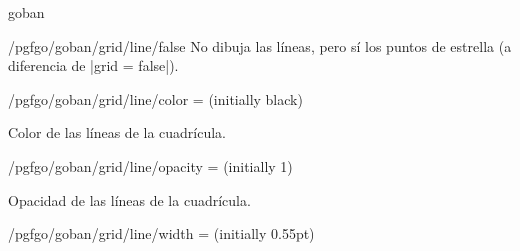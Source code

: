 \begin{environment}{{goban}}
	\begin{stylekey}{/pgfgo/goban/grid/line/false}
		No dibuja las líneas, pero sí los puntos de estrella (a diferencia de |grid = false|).

		\begin{codeexample}[]
			\begin{goban}[9, grid = {line = false}, hoshi = {radius = 2pt}]
			\end{goban}
		\end{codeexample}
	\end{stylekey}
	
	\begin{key}{/pgfgo/goban/grid/line/color = (initially black)}
		
		Color de las líneas de la cuadrícula.
		
		\begin{codeexample}[]
			
			\begin{goban}[grid = {line = {color = blue}}, name = a]
			\end{goban}
			
			\begin{goban}[grid = {line = {color = red}}, resume = a]
			\end{goban}
		\end{codeexample}
	\end{key}
	
	\begin{key}{/pgfgo/goban/grid/line/opacity = (initially 1)}
		
		Opacidad de las líneas de la cuadrícula.
		
		\begin{codeexample}[]
			
			\begin{goban}[name = a]
			\end{goban}
			
			\begin{goban}[grid = {line = {opacity = 0.2}}, resume = a]
			\end{goban}
		\end{codeexample}
	\end{key}
	
	\begin{key}{/pgfgo/goban/grid/line/width = (initially 0.55pt)}
		

\end{key}
\end{environment}
